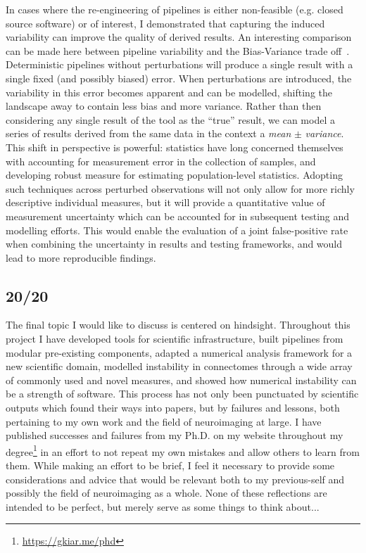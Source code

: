 In cases where the re-engineering of pipelines is either non-feasible (e.g. closed source software) or of
interest, I demonstrated that capturing the induced variability can improve the quality of derived results. An
interesting comparison can be made here between pipeline variability and the Bias-Variance
trade off~\cite{jain2000statistical}. Deterministic pipelines without perturbations will produce a single result
with a single fixed (and possibly biased) error. When perturbations are introduced, the variability in this
error becomes apparent and can be modelled, shifting the landscape away to contain less bias and more variance.
Rather than then considering any single result of the tool as the ``true'' result, we can model a series of
results derived from the same data in the context a \textit{mean} $\pm$ \textit{variance}. This shift in
perspective is powerful: statistics have long concerned themselves with accounting for measurement error in the
collection of samples, and developing robust measure for estimating population-level statistics. Adopting such
techniques across perturbed observations will not only allow for more richly descriptive individual
measures, but it will provide a quantitative value of measurement uncertainty which can be accounted for
in subsequent testing and modelling efforts. This would enable the evaluation of a joint false-positive rate
when combining the uncertainty in results and testing frameworks, and would lead to more reproducible findings.

\subsection{20/20}
The final topic I would like to discuss is centered on hindsight. Throughout this project I have developed tools
for scientific infrastructure, built pipelines from modular pre-existing components, adapted a numerical analysis
framework for a new scientific domain, modelled instability in connectomes through a wide array of commonly used
and novel measures, and showed how numerical instability can be a strength of software. This process has not only
been punctuated by scientific outputs which found their ways into papers, but by failures and lessons, both
pertaining to my own work and the field of neuroimaging at large. I have published successes and failures from my
Ph.D. on my website throughout my degree\footnote{\url{https://gkiar.me/phd}} in an effort to not repeat my own
mistakes and allow others to learn from them. While making an effort to be brief, I feel it necessary to provide
some considerations and advice that would be relevant both to my previous-self and possibly the field of
neuroimaging as a whole. None of these reflections are intended to be perfect, but merely serve as some things to
think about...

